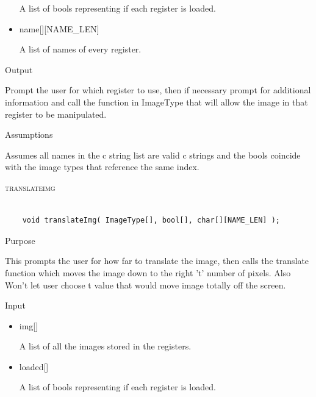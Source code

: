 \documentclass[pdftex, 11pt]{article}
\begin{document}
\begin{description}
\begin{description}
\begin{itemize}
						A list of bools representing if each register is loaded.

					\item{name[][NAME\_LEN]}

						A list of names of every register.

				\end{itemize}

			\item{Output}

				Prompt the user for which register to use, then if necessary
				prompt for additional information and call the function
				in ImageType that will allow the image in that register to
				be manipulated.

			\item{Assumptions}

				Assumes all names in the c string list are valid c
				strings and the bools coincide with the image types that
				reference the same index.

		\end{description}



	\item{\textsc{translateimg}}

		\begin{lstlisting}

	void translateImg( ImageType[], bool[], char[][NAME_LEN] );
		\end{lstlisting}

		\begin{description}
			\item{Purpose}
			
				This prompts the user for how far to translate the image, then calls the
				translate function which moves the image down to the right 't' number of
				pixels.  Also Won't let user choose t value that would move image totally off
				the screen.

			\item{Input}

				\begin{itemize}

					\item{img[]}

						A list of all the images stored in the registers.

					\item{loaded[]}

						A list of bools representing if each register is loaded.


\end{itemize}
\end{description}
\end{description}
\end{document}
